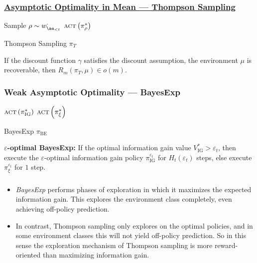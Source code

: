 \documentclass[UTF8,11pt,colorlinks,compress,openany]{beamer}%
\begin{document}
\begin{frame}\frametitle{\href{https://jan.leike.name/}{Asymptotic Optimality in Mean --- Thompson Sampling}}
\begin{algorithm}[H]
\begin{algorithmic}[1]
\Loop
\State Sample $\rho\sim w_{\ae_{<t}}^\cdot$
\State $\textsc{act}\left(\pi_{\rho}^*\right)$
\EndFor
\EndLoop
\end{algorithmic}
\caption{Thompson Sampling $\pi_T$}\label{alg:thompson}
\end{algorithm}
	\begin{theorem}
		If the discount function $\gamma$ satisfies the discount assumption, the environment $\mu$ is recoverable, then $R_m(\pi_T,\mu)\in o(m)$.
	\end{theorem}
\end{frame}

\begin{frame}\frametitle{Weak Asymptotic Optimality --- BayesExp}
\begin{algorithm}[H]
\begin{algorithmic}[1]
\Loop
{}
\State $\textsc{act}\left(\pi_{\mathrm{IG}}^*\right)$
\EndFor
\Else
\State $\textsc{act}\left(\pi_{\xi}^*\right)$
\EndIf
\EndLoop
\end{algorithmic}
\caption{BayesExp $\pi_{\mathrm{BE}}$}\label{alg:bayesexp}
\end{algorithm}
	\textbf{$\varepsilon$-optimal BayesExp:} If the optimal information gain value $V_{\mathrm{IG}}^*>\varepsilon_t$, then execute the $\varepsilon$-optimal information gain policy $\pi_{\mathrm{IG}}^{\varepsilon_t}$ for $H_t(\varepsilon_t)$ steps, else execute $\pi_\xi^{\varepsilon_t}$ for $1$ step.
\end{frame}

\begin{frame}\frametitle{}
\begin{itemize}
	\item \emph{BayesExp} performs phases of exploration in which it maximizes the expected information gain. This explores the environment class completely, even achieving off-policy prediction.
	\item In contrast, Thompson sampling only explores on the optimal policies, and in some environment classes this will not yield off-policy prediction. So in this sense the exploration mechanism of Thompson sampling is more reward-oriented than maximizing information gain.
\end{itemize}
\end{frame}
\end{document}
